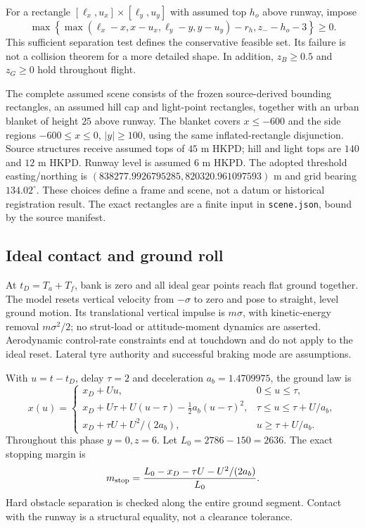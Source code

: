For a rectangle $[\ell_x,u_x]\times[\ell_y,u_y]$ with assumed top $h_o$ above runway, impose
\begin{equation}\label{eq:obstacle}
 \max\left\{\max(\ell_x-x,x-u_x,\ell_y-y,y-u_y)-r_h,
 z_--h_o-3\right\}\geq0.
\end{equation}
This sufficient separation test defines the conservative feasible set. Its failure is not a collision theorem for a more detailed shape. In addition, $z_B\geq0.5$ and $z_G\geq0$ hold throughout flight.

The complete assumed scene consists of the frozen source-derived bounding rectangles, an assumed hill cap and light-point rectangles, together with an urban blanket of height $25$ above runway. The blanket covers $x\leq-600$ and the side regions $-600\leq x\leq0$, $|y|\geq100$, using the same inflated-rectangle disjunction. Source structures receive assumed tops of $45$ m HKPD; hill and light tops are $140$ and $12$ m HKPD. Runway level is assumed $6$ m HKPD. The adopted threshold easting/northing is $(838277.9926795285,820320.961097593)$ m and grid bearing $134.02^\circ$. These choices define a frame and scene, not a datum or historical registration result. The exact rectangles are a finite input in \texttt{scene.json}, bound by the source manifest.

\subsection{Ideal contact and ground roll}\label{sec:ground}
At $t_D=T_a+T_f$, bank is zero and all ideal gear points reach flat ground together. The model resets vertical velocity from $-\sigma$ to zero and pose to straight, level ground motion. Its translational vertical impulse is $m\sigma$, with kinetic-energy removal $m\sigma^2/2$; no strut-load or attitude-moment dynamics are asserted. Aerodynamic control-rate constraints end at touchdown and do not apply to the ideal reset. Lateral tyre authority and successful braking mode are assumptions.

With $u=t-t_D$, delay $\tau=2$ and deceleration $a_b=1.4709975$, the ground law is
\begin{equation}\label{eq:ground}
 x(u)=\begin{cases}
 x_D+Uu,&0\leq u\leq\tau,\\
 x_D+U\tau+U(u-\tau)-\tfrac12a_b(u-\tau)^2,&\tau\leq u\leq\tau+U/a_b,\\
 x_D+\tau U+U^2/(2a_b),&u\geq\tau+U/a_b.
 \end{cases}
\end{equation}
Throughout this phase $y=0,z=6$. Let $L_0=2786-150=2636$. The exact stopping margin is
\begin{equation}\label{eq:stop}
 m_{\rm stop}=\frac{L_0-x_D-\tau U-U^2/(2a_b)}{L_0}.
\end{equation}
Hard obstacle separation is checked along the entire ground segment. Contact with the runway is a structural equality, not a clearance tolerance.

